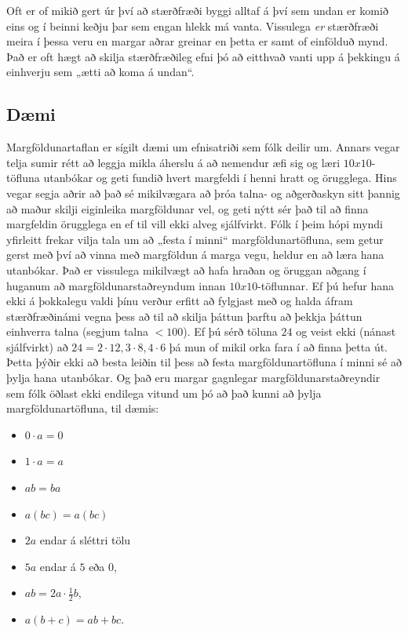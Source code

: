 \documentclass[
  icelandic,
]{book}
\providecommand{\tightlist}{%
  \setlength{\itemsep}{0pt}\setlength{\parskip}{0pt}}
\begin{document}
Oft er of mikið gert úr því að stærðfræði byggi alltaf á því sem undan er komið eins og í beinni keðju þar sem engan hlekk má vanta. Vissulega \emph{er} stærðfræði meira í þessa veru en margar aðrar greinar en þetta er samt of einfölduð mynd. Það er oft hægt að skilja stærðfræðileg efni þó að eitthvað vanti upp á þekkingu á einhverju sem „ætti að koma á undan``.

\subsection{Dæmi}\label{duxe6mi-2}

Margföldunartaflan er sígilt dæmi um efnisatriði sem fólk deilir um. Annars vegar telja sumir rétt að leggja mikla áherslu á að nemendur æfi sig og læri \(10x10\)-töfluna utanbókar og geti fundið hvert margfeldi í henni hratt og örugglega. Hins vegar segja aðrir að það sé mikilvægara að þróa talna- og aðgerðaskyn sitt þannig að maður skilji eiginleika margföldunar vel, og geti nýtt sér það til að finna margfeldin örugglega en ef til vill ekki alveg sjálfvirkt. Fólk í þeim hópi myndi yfirleitt frekar vilja tala um að „festa í minni`` margföldunartöfluna, sem getur gerst með því að vinna með margföldun á marga vegu, heldur en að læra hana utanbókar. Það er vissulega mikilvægt að hafa hraðan og öruggan aðgang í huganum að margföldunarstaðreyndum innan \(10x10\)-töflunnar. Ef þú hefur hana ekki á þokkalegu valdi þínu verður erfitt að fylgjast með og halda áfram stærðfræðinámi vegna þess að til að skilja þáttun þarftu að þekkja þáttun einhverra talna (segjum talna \(<100\)). Ef þú sérð töluna \(24\) og veist ekki (nánast sjálfvirkt) að \(24 = 2 \cdot 12, 3 \cdot 8, 4 \cdot 6\) þá mun of mikil orka fara í að finna þetta út. Þetta þýðir ekki að besta leiðin til þess að festa margföldunartöfluna í minni sé að þylja hana utanbókar. Og það eru margar gagnlegar margföldunarstaðreyndir sem fólk öðlast ekki endilega vitund um þó að það kunni að þylja margföldunartöfluna, til dæmis:

\begin{itemize}
\tightlist
\item
  \(0 \cdot a = 0\)
\item
  \(1 \cdot a = a\)
\item
  \(ab = ba\)
\item
  \(a(bc)=a(bc)\)
\item
  \(2a\) endar á sléttri tölu
\item
  \(5a\) endar á \(5\) eða \(0\),
\item
  \(ab = 2a \cdot \frac{1}{2}b\),
\item
  \(a(b+c) = ab + bc\).
\end{itemize}
\end{document}
